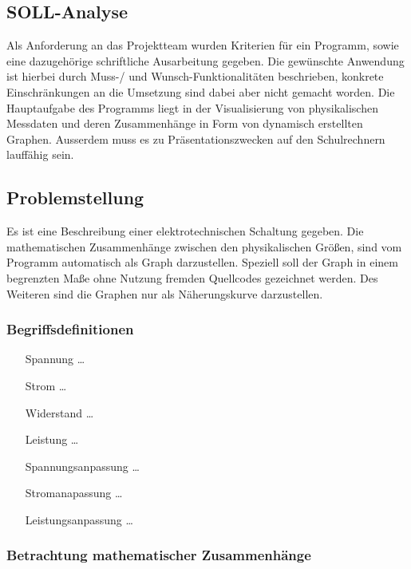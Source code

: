 \documentclass{article}
\begin{document}
\subsection{SOLL-Analyse}

    Als Anforderung an das Projektteam wurden Kriterien für ein Programm, sowie eine dazugehörige schriftliche Ausarbeitung gegeben. Die gewünschte Anwendung ist hierbei durch Muss-/ und Wunsch-Funktionalitäten beschrieben, konkrete Einschränkungen an die Umsetzung sind dabei aber nicht gemacht worden. Die Hauptaufgabe des Programms liegt in der Visualisierung von physikalischen Messdaten und deren Zusammenhänge in Form von dynamisch erstellten Graphen. Ausserdem muss es zu Präsentationszwecken auf den Schulrechnern lauffähig sein.

\subsection{Problemstellung}

    Es ist eine Beschreibung einer elektrotechnischen Schaltung gegeben. Die mathematischen Zusammenhänge zwischen den physikalischen Größen, sind vom Programm automatisch als Graph darzustellen. Speziell soll der Graph in einem begrenzten Maße ohne Nutzung fremden Quellcodes gezeichnet werden. Des Weiteren sind die Graphen nur als Näherungskurve darzustellen.

    \subsubsection{Begriffsdefinitionen}
    \begin{itemize}
        \item[Spannung] \dots
        \item[Strom] \dots
        \item[Widerstand] \dots
        \item[Leistung] \dots
        \item[Spannungsanpassung] \dots
        \item[Stromanapassung] \dots
        \item[Leistungsanpassung] \dots
    \end{itemize}

    \subsubsection{Betrachtung mathematischer Zusammenhänge}
\end{document}
